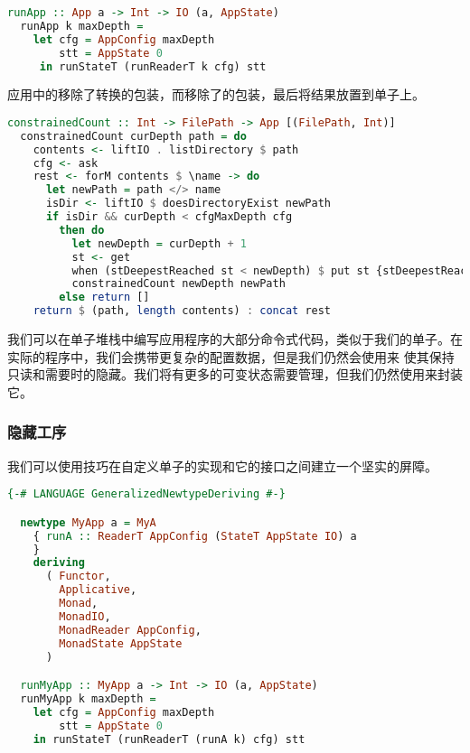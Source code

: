\documentclass[./main.tex]{subfiles}
\begin{document}
\begin{lstlisting}[language=Haskell]
  runApp :: App a -> Int -> IO (a, AppState)
  runApp k maxDepth =
    let cfg = AppConfig maxDepth
        stt = AppState 0
     in runStateT (runReaderT k cfg) stt
\end{lstlisting}

应用中的移除了转换的包装，而移除了的包装，最后将结果放置到单子上。

\begin{lstlisting}[language=Haskell]
  constrainedCount :: Int -> FilePath -> App [(FilePath, Int)]
  constrainedCount curDepth path = do
    contents <- liftIO . listDirectory $ path
    cfg <- ask
    rest <- forM contents $ \name -> do
      let newPath = path </> name
      isDir <- liftIO $ doesDirectoryExist newPath
      if isDir && curDepth < cfgMaxDepth cfg
        then do
          let newDepth = curDepth + 1
          st <- get
          when (stDeepestReached st < newDepth) $ put st {stDeepestReached = newDepth}
          constrainedCount newDepth newPath
        else return []
    return $ (path, length contents) : concat rest
\end{lstlisting}

我们可以在单子堆栈中编写应用程序的大部分命令式代码，类似于我们的单子。在实际的程序中，我们会携带更复杂的配置数据，但是我们仍然会使用来
使其保持只读和需要时的隐藏。我们将有更多的可变状态需要管理，但我们仍然使用来封装它。

\subsubsection*{隐藏工序}

我们可以使用技巧在自定义单子的实现和它的接口之间建立一个坚实的屏障。

\begin{lstlisting}[language=Haskell]
  {-# LANGUAGE GeneralizedNewtypeDeriving #-}

  newtype MyApp a = MyA
    { runA :: ReaderT AppConfig (StateT AppState IO) a
    }
    deriving
      ( Functor,
        Applicative,
        Monad,
        MonadIO,
        MonadReader AppConfig,
        MonadState AppState
      )

  runMyApp :: MyApp a -> Int -> IO (a, AppState)
  runMyApp k maxDepth =
    let cfg = AppConfig maxDepth
        stt = AppState 0
    in runStateT (runReaderT (runA k) cfg) stt
\end{lstlisting}
\end{document}
